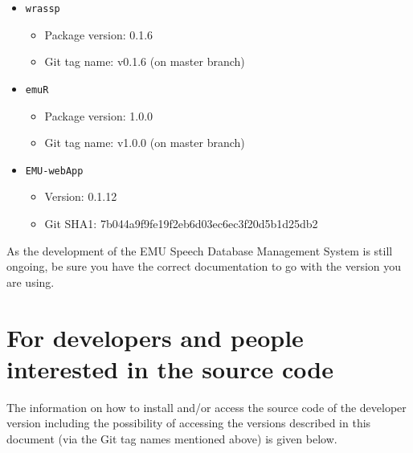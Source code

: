 \documentclass[]{book}
\providecommand{\tightlist}{%
  \setlength{\itemsep}{0pt}\setlength{\parskip}{0pt}}
\theoremstyle{definition}
\theoremstyle{definition}
\theoremstyle{definition}
\theoremstyle{remark}
\begin{document}
\begin{itemize}
\tightlist
\item
  \texttt{wrassp}

  \begin{itemize}
  \tightlist
  \item
    Package version: 0.1.6
  \item
    Git tag name: v0.1.6 (on master branch)
  \end{itemize}
\item
  \texttt{emuR}

  \begin{itemize}
  \tightlist
  \item
    Package version: 1.0.0
  \item
    Git tag name: v1.0.0 (on master branch)
  \end{itemize}
\item
  \texttt{EMU-webApp}

  \begin{itemize}
  \tightlist
  \item
    Version: 0.1.12
  \item
    Git SHA1: 7b044a9f9fe19f2eb6d03ec6ec3f20d5b1d25db2
  \end{itemize}
\end{itemize}

As the development of the EMU Speech Database Management System is still
ongoing, be sure you have the correct documentation to go with the
version you are using.

\hypertarget{for-developers-and-people-interested-in-the-source-code}{%
\section{For developers and people interested in the source
code}\label{for-developers-and-people-interested-in-the-source-code}}

The information on how to install and/or access the source code of the
developer version including the possibility of accessing the versions
described in this document (via the Git tag names mentioned above) is
given below.
\end{document}
